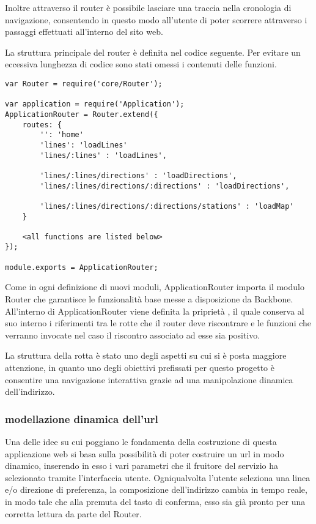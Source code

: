 Inoltre attraverso il router è possibile lasciare una traccia nella cronologia di navigazione, consentendo in questo modo all'utente di poter scorrere attraverso i passaggi effettuati all'interno del sito web.

La struttura principale del router è definita nel codice seguente. Per evitare un eccessiva lunghezza di codice sono stati omessi i contenuti delle funzioni.

\begin{lstlisting}
var Router = require('core/Router');

var application = require('Application');
ApplicationRouter = Router.extend({
    routes: {
        '': 'home'
        'lines': 'loadLines'
        'lines/:lines' : 'loadLines',

        'lines/:lines/directions' : 'loadDirections',
        'lines/:lines/directions/:directions' : 'loadDirections',

        'lines/:lines/directions/:directions/stations' : 'loadMap'
    }

    <all functions are listed below>
});

module.exports = ApplicationRouter;
\end{lstlisting}
\newpage

Come in ogni definizione di nuovi moduli, ApplicationRouter importa il modulo Router che garantisce le funzionalità base messe a disposizione da Backbone. 
All'interno di ApplicationRouter viene definita la priprietà , il quale conserva al suo interno i riferimenti tra le rotte che il router deve riscontrare e le funzioni che verranno invocate nel caso il riscontro associato ad esse sia positivo.

La struttura della rotta è stato uno degli aspetti su cui si è posta maggiore attenzione, in quanto uno degli obiettivi prefissati per questo progetto è consentire una navigazione interattiva grazie ad una manipolazione dinamica dell'indirizzo.

\subsubsection{modellazione dinamica dell'url} %
\label{ssub:modellazione_dinamica_dell_url}


Una delle idee su cui poggiano le fondamenta della costruzione di questa applicazione web si basa sulla possibilità di poter costruire un url in modo dinamico, inserendo in esso i vari parametri che il fruitore del servizio ha selezionato tramite l'interfaccia utente.
Ogniqualvolta l'utente seleziona una linea e/o direzione di preferenza, la composizione dell'indirizzo cambia in tempo reale, in modo tale che alla premuta del tasto di conferma, esso sia già pronto per una corretta lettura da parte del Router.

